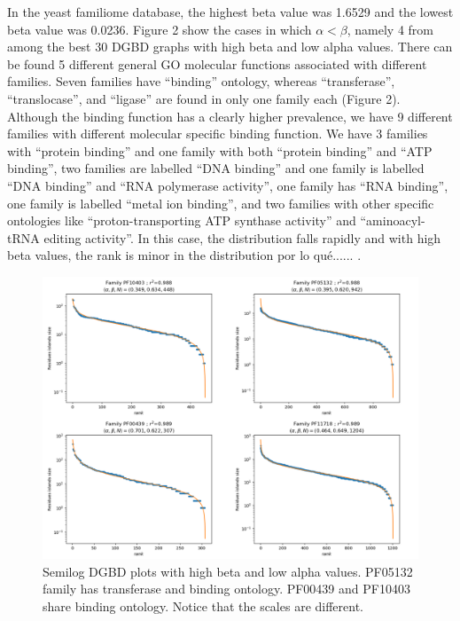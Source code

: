 \documentclass[preprint,12pt]{elsarticle}
\begin{document}
In the yeast familiome database, the highest beta value was 1.6529 
and the lowest beta value was 0.0236. Figure 2 show the cases in 
which $\alpha < \beta $, namely  4 from among the best 30 DGBD 
graphs with high beta and low alpha values. There can be found 5 
different general GO molecular functions associated  with different 
families. Seven families have ``binding'' ontology, whereas ``transferase'', 
``translocase'', and ``ligase'' are found in only one family each 
(Figure 2). Although the binding function  has a clearly higher 
prevalence, we have 9 different families with different molecular 
specific binding function. We have 3 families with ``protein binding'' 
and one family with both ``protein binding'' and ``ATP binding'', 
two families are labelled ``DNA binding'' and one family is labelled 
``DNA binding'' and ``RNA polymerase activity'', one family has 
``RNA binding'', one family is labelled ``metal ion binding'', and 
two families with other specific ontologies like ``proton-transporting 
ATP synthase activity'' and ``aminoacyl-tRNA editing activity''. 
In this case, the distribution falls rapidly and with high beta values, 
the rank is minor in the distribution por lo qué...... 
\cite{martinez2009universality}.


\begin{figure} %
    \centering
    \includegraphics[width=13cm]{images/02_mejoresBeta.png}
    \bigbreak
    \caption {Semilog DGBD plots with high beta and low alpha values. 
    PF05132 family has transferase and binding ontology. PF00439 and 
    PF10403 share binding ontology. Notice that the scales are different.}
    \label{fig:beta}
\end{figure}
\clearpage
\end{document}
